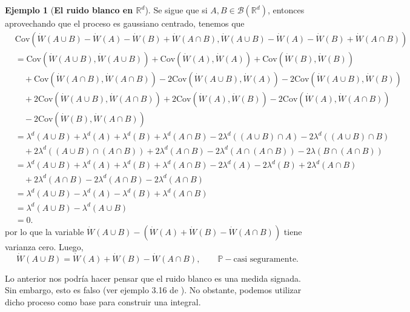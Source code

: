 \documentclass[letterpaper,twoside,12pt]{book}
\newcommand{\R}{\mathbb{R}}
\newcommand{\B}{\mathcal{B}}
\renewcommand{\P}{\mathbb{P}}
\newcommand{\W}{\dot{W}}
\newcommand{\1}{\mathds{1}}
\theoremstyle{definition}
\theoremstyle{definition}
\theoremstyle{remark}
\theoremstyle{definition}
\theoremstyle{definition}
\theoremstyle{definition}
\theoremstyle{definition}
\newtheorem{ejem}{Ejemplo}
\theoremstyle{definition}
\begin{document}
\begin{ejem}[\textbf{El ruido blanco en $\R^{d}$}]
Se sigue que si $A,B\in \B(\R^d)$, entonces aprovechando que el proceso es gaussiano centrado, tenemos que
\begin{align*}
    &\text{Cov}\left(\W(A\cup B)-\W(A)-\W(B)+\W(A\cap B),\W(A\cup B)-\W(A)-\W(B)+\W(A\cap B)\right)\\
    &=\text{Cov}\left(\W(A\cup B),\W(A\cup B)\right)+\text{Cov}\left(\W(A),\W(A)\right)+\text{Cov}\left(\W(B),\W(B)\right)\\
    &\quad +\text{Cov}\left(\W(A\cap B),\W(A\cap B)\right)-2 \text{Cov}\left(\W(A\cup B),\W(A)\right)-2 \text{Cov}\left(\W(A\cup B), \W(B)\right)\\
    &\quad +2 \text{Cov}\left(\W(A\cup B), \W(A\cap B)\right)+2 \text{Cov}\left(\W(A),\W(B)\right)-2 \text{Cov}\left(\W(A),\W(A\cap B)\right)\\
    &\quad -2 \text{Cov}\left(\W(B),\W(A\cap B)\right)\\
    &=\lambda^{d}(A\cup B)+\lambda^{d}(A)+\lambda^{d}(B)+\lambda^{d}(A\cap B)-2\lambda^{d}((A\cup B)\cap A)-2\lambda^{d}((A\cup B)\cap B)\\
    &\quad+2\lambda^{d}((A\cup B)\cap (A\cap B))+2\lambda^{d}(A\cap B)-2\lambda^{d}(A\cap (A\cap B))-2\lambda(B\cap(A\cap B))\\
    &=\lambda^{d}(A\cup B)+\lambda^d(A)+\lambda^{d}(B)+\lambda^{d}(A\cap B)-2\lambda^{d}(A)-2\lambda^{d}(B)+2\lambda^{d}(A\cap B)\\
    &\quad +2\lambda^{d}(A\cap B)-2\lambda^{d}(A\cap B)-2\lambda^{d}(A\cap B)\\
    &=\lambda^{d}(A\cup B)-\lambda^d(A)-\lambda^{d}(B)+\lambda^{d}(A\cap B)\\
    &=\lambda^{d}(A\cup B)-\lambda^{d}(A\cup B)\\
    &=0.
\end{align*}
por lo que la variable $\W(A\cup B)-(\W(A)+\W(B)-\W(A\cap B))$ tiene varianza cero. Luego,
\begin{equation}\label{Wdotmeasure}    
    \W(A\cup B)=\W(A)+\W(B)-\W(A\cap B), \qquad \P-\text{casi seguramente}.
\end{equation}


\end{ejem}
Lo anterior nos podría hacer pensar que el ruido blanco es una medida signada. Sin embargo, esto es falso (ver ejemplo 3.16 de \cite{Khoshnevisan2009}). No obstante, podemos utilizar dicho proceso como base para construir una integral.
\end{document}
